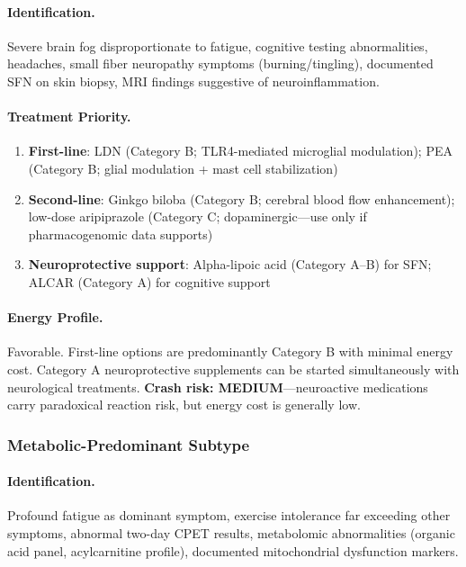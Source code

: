 \paragraph{Identification.} Severe brain fog disproportionate to fatigue, cognitive testing abnormalities, headaches, small fiber neuropathy symptoms (burning/tingling), documented SFN on skin biopsy, MRI findings suggestive of neuroinflammation.

\paragraph{Treatment Priority.}
\begin{enumerate}
    \item \textbf{First-line}: LDN (Category B; TLR4-mediated microglial modulation); PEA (Category B; glial modulation + mast cell stabilization)
    \item \textbf{Second-line}: Ginkgo biloba (Category B; cerebral blood flow enhancement); low-dose aripiprazole (Category C; dopaminergic---use only if pharmacogenomic data supports)
    \item \textbf{Neuroprotective support}: Alpha-lipoic acid (Category A--B) for SFN; ALCAR (Category A) for cognitive support
\end{enumerate}

\paragraph{Energy Profile.} Favorable. First-line options are predominantly Category B with minimal energy cost. Category A neuroprotective supplements can be started simultaneously with neurological treatments. \textbf{Crash risk: MEDIUM}---neuroactive medications carry paradoxical reaction risk, but energy cost is generally low.

\subsubsection{Metabolic-Predominant Subtype}

\paragraph{Identification.} Profound fatigue as dominant symptom, exercise intolerance far exceeding other symptoms, abnormal two-day CPET results, metabolomic abnormalities (organic acid panel, acylcarnitine profile), documented mitochondrial dysfunction markers.

